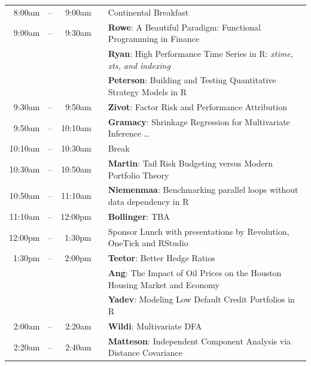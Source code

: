 \documentclass[11pt]{article}
\newcommand{\mylinecolor}[1]{\color{#1}\vspace{-8pt}}  %
\begin{document}
\begin{tabular}{rlrlp{5in}}
  8:00am  & -- &  9:00am &   & \small{\mylinecolor{Breaks} Continental Breakfast}  \\
   9:00am & -- &  9:30am &   & \textbf{\color{LightningTalk} Rowe}: \small{A Beautiful Paradigm: Functional Programming in Finance} \\
          &    &         &   & \textbf{\color{LightningTalk} Ryan}: \small{High Performance Time Series in R: \emph{xtime, xts, and indexing}} \\
          &    &         &   & \textbf{\color{LightningTalk} Peterson}: \small{Building and Testing Quantitative Strategy Models in R} \\
  9:30am  & -- &  9:50am &   & \textbf{\color{Talk} Zivot}: \small{Factor Risk and Performance Attribution} \\
  9:50am  & -- &  10:10am &   & \textbf{\color{Talk} Gramacy}: \small{Shrinkage Regression for Multivariate Inference \ldots} \\ %
  10:10am & -- & 10:30am &   & \small{\mylinecolor{Breaks}  Break}  \\
  10:30am  & -- &  10:50am &   & \textbf{\color{Talk} Martin}: \small{Tail Risk Budgeting versus Modern Portfolio Theory} \\
  10:50am  & -- &  11:10am &   & \textbf{\color{Talk} Niemenmaa}: \small{Benchmarking parallel loops without data dependency in R} \\
  11:10am & -- & 12:00pm &   & \textbf{\color{KeynoteTalk} Bollinger}: \small{TBA} \\
  12:00pm & -- &  1:30pm &   & \small{\mylinecolor{Breaks}  Sponsor Lunch with presentations by Revolution, OneTick and RStudio}  \\
   1:30pm & -- &  2:00pm &   & \textbf{\color{LightningTalk} Teetor}: \small{Better Hedge Ratios} \\
          &    &         &   & \textbf{\color{LightningTalk} Ang}: \small{The Impact of Oil Prices on the Houston Housing Market and Economy} \\
          &    &         &   & \textbf{\color{LightningTalk} Yadev}: \small{Modeling Low Default Credit Portfolios in R} \\
  2:00am  & -- &  2:20am &   & \textbf{\color{Talk} Wildi}: \small{Multivariate DFA} \\
  2:20am  & -- &  2:40am &   & \textbf{\color{Talk} Matteson}: \small{Independent Component Analysis via Distance Covariance} \\

\end{tabular}
\end{document}
